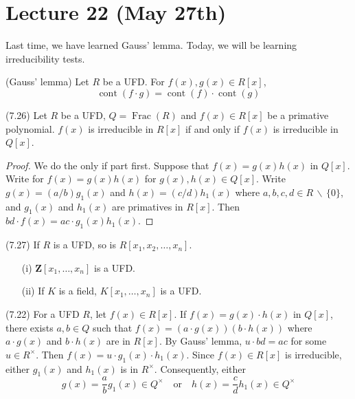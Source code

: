 \section{Lecture 22 (May 27th)}
Last time, we have learned Gauss' lemma. Today, we will be learning irreducibility tests. 
\newline
\begin{recall}
(Gauss' lemma) Let $R$ be a UFD. For $f(x), g(x)\in R[x]$, 
\[\mathop{\mathrm{cont}}(f\cdot g)=\mathop{\mathrm{cont}}(f)\cdot \mathop{\mathrm{cont}}(g)\]
\end{recall}
\vspace{2ex}
\begin{cor}
(7.26) Let $R$ be a UFD, $Q=\mathop{\mathrm{Frac}}(R)$ and $f(x)\in R[x]$ be a primative polynomial. $f(x)$ is irreducible in $R[x]$ if and only if $f(x)$ is irreducible in $Q[x]$.
\end{cor}
\vspace{2ex}
\begin{proof}
We do the only if part first. Suppose that $f(x)=g(x)h(x)$ in $Q[x]$. Write for $f(x)=g(x)h(x)$ for $g(x),h(x)\in Q[x]$. Write $g(x)=(a/b)g_1(x)$ and $h(x)=(c/d)h_1(x)$ where $a,b,c,d\in R\,\backslash\,\{0\}$, and $g_1(x)$ and $h_1(x)$ are primatives in $R[x]$. Then $bd\cdot f(x)=ac\cdot g_1(x)h_1(x)$.
\end{proof}
\vspace{2ex}
\begin{cor}
(7.27) If $R$ is a UFD, so is $R[x_1,x_2,\ldots ,x_{n}]$. 
\end{cor}
\vspace{2ex}
\begin{ex}
\begin{itemize}
\item[(i)] ${\bm Z}[x_1,\ldots ,x_{n}]$ is a UFD.
\item[(ii)] If $K$ is a field, $K[x_1,\ldots ,x_{n}]$ is a UFD.
\end{itemize}
\end{ex}
\vspace{2ex}
\begin{thm}
(7.22) For a UFD $R$, let $f(x)\in R[x]$. If $f(x)=g(x)\cdot h(x)$ in $Q[x]$, there exists $a,b\in Q$ such that $f(x)=(a\cdot g(x))(b\cdot h(x))$ where $a\cdot g(x)$ and $b\cdot h(x)$ are in $R[x]$. By Gauss' lemma, $u\cdot bd=ac$ for some $u\in R^{\times }$. Then $f(x)=u\cdot g_1(x)\cdot h_1(x)$. Since $f(x)\in R[x]$ is irreducible, either $g_1(x)$ and $h_1(x)$ is in $R^{\times }$. Consequently, either 
\[g(x)=\dfrac{a}{b}g_1(x)\in Q^{\times }\quad\mathrm{or}\quad h(x)=\dfrac{c}{d}h_1(x)\in Q^{\times }\]
\end{thm}
